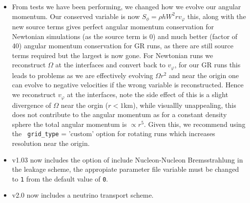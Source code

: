 \documentclass[10pt,nofootinbib]{article}
\newcommand{\code}[1]{\texttt{#1}}
\begin{document}
\begin{itemize}
\item From tests we have been performing, we changed how we evolve our
  angular momentum.  Our conserved variable is now $S_\phi = \rho h W^2
  r v_\varphi$ this, along with the new source terms gives perfect
  angular momentum conservation for Newtonian simulations (as the
  source term is 0) and much better (factor of 40) angular momentum
  conservation for GR runs, as there are still source terms required
  but the largest is now gone.  For Newtonian runs we reconstruct
  $\Omega$ at the interfaces and convert back to $v_\varphi$, for our
  GR runs this leads to problems as we are effectively evolving
  $\Omega r^2$ and near the origin one can evolve to negative
  velocities if the wrong variable is reconstructed.  Hence we
  reconstruct $v_\varphi$ at the interfaces, note the side effect of
  this is a slight divergence of $\Omega$ near the orgin ($r<1$km),
  while visuallly unappealing, this does not contribute to the angular
  momentum as for a constant density sphere the total angular momentum
  is $\propto r^5$. Given this, we recommend using the {\tt
    grid\_type} = 'custom' option for rotating runs which increases
  resolution near the origin.
\item v1.03 now includes the option of include Nucleon-Nucleon
  Bremsstrahlung in the leakage scheme, the appropiate parameter file
  variable must be changed to \code{1} from the default value of
  \code{0}.
\item v2.0 now includes a neutrino transport scheme.
\end{itemize}
\end{document}

